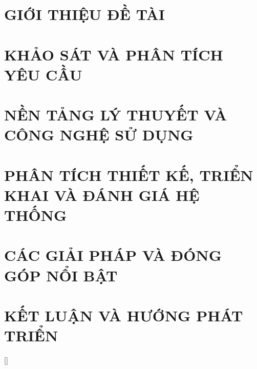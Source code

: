\documentclass[a4paper,13pt,3p,twoside]{report}
\renewcommand{\bibname}{Danh_sach_tai_lieu_tham_khao}
\theoremstyle{definition}
\begin{document}


\newpage
{}

\pagestyle{fancy}
\fancyhf{}
\fancyhead[RE, LO]{\leftmark}
\fancyfoot[RE, LO]{\thepage}

\chapter{GIỚI THIỆU ĐỀ TÀI}
\label{chapter:Introduction}

\newpage
\chapter{KHẢO SÁT VÀ PHÂN TÍCH YÊU CẦU}
\label{chapter:Related_works}



\newpage
\chapter{NỀN TẢNG LÝ THUYẾT VÀ CÔNG NGHỆ SỬ DỤNG}
\label{chapter:Methodology}


\newpage
\chapter{PHÂN TÍCH THIẾT KẾ, TRIỂN KHAI VÀ ĐÁNH GIÁ HỆ THỐNG}
\label{chapter:Experiment}


\newpage
\chapter{CÁC GIẢI PHÁP VÀ ĐÓNG GÓP NỔI BẬT}
\label{chapter:SolutionAndContribution}

\newpage
\chapter{KẾT LUẬN VÀ HƯỚNG PHÁT TRIỂN}
\label{chapter:conclusion}


\newpage
\renewcommand\bibname{TÀI LIỆU THAM KHẢO}
\printbibliography
{}

\appendixpage
\appendices
\addappheadtotoc

[]
\titlespacing*{\chapter}{0pt}{-20pt}{20pt}
\end{document}
